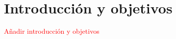 \chapter*{Introducción y objetivos}


\textcolor{red}{Añadir introducción y objetivos}


\begin{comment}

La introducción deberá:
- Contextualizar el trabajo explicando antecedentes importantes para el desarrollo realizado y efectuando, en su caso, un estudio de los progresos recientes.
- Describir el problema abordado, de forma que el lector tenga desde este momento una idea clara de la cuestión a resolver o del producto  a desarrollar y una  visión general de la solución alcanzada.
- Exponer con claridad las técnicas y áreas matemáticas, así como los conceptos y herramientas de la ingeniería informática que se han empleado.
- Sintetizar el contenido de la memoria.
- Citar las principales fuentes consultadas.

Objetivos del trabajo:
- En  este apartado deberán aparecer con claridad los objetivos inicialmente previstos en la propuesta de TFG y los finalmente alcanzados con indicación de  dificultades, cambios y mejoras respecto a la propuesta inicial. Si procede, es conveniente apuntar de manera precisalas interdependencias entre los distintos objetivos y conectarlos con los diferentes apartadosde la memoria. 
Se pueden destacar aquí los aspectos formativos previos más utilizados.
\end{comment}

